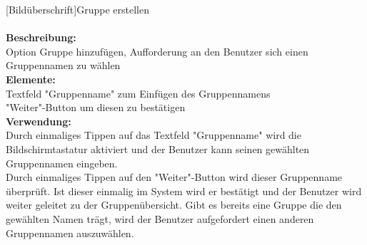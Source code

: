 [Bildüberschrift]Gruppe erstellen\\ \\
\textbf{Beschreibung:}\\
Option Gruppe hinzufügen, Aufforderung an den Benutzer sich einen Gruppennamen zu wählen\\
\textbf{Elemente:}\\
Textfeld "Gruppenname" zum Einfügen des Gruppennamens\\
"Weiter"-Button um diesen zu bestätigen\\
\textbf{Verwendung:}\\
Durch einmaliges Tippen auf das Textfeld "Gruppenname" wird die Bildschirmtastatur aktiviert und der Benutzer kann seinen gewählten Gruppennamen eingeben.\\
Durch einmaliges Tippen auf den "Weiter"-Button wird dieser Gruppenname überprüft. Ist dieser einmalig im System wird er bestätigt und der Benutzer wird weiter geleitet zu der Gruppenübersicht. Gibt es bereits eine Gruppe die den gewählten Namen trägt, wird der Benutzer aufgefordert einen anderen Gruppennamen auszuwählen.\\ \\


